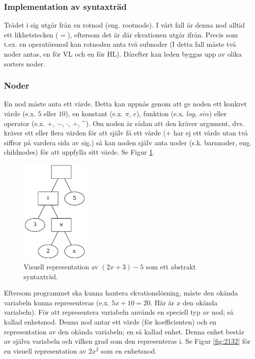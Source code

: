 \documentclass[12pt,a4paper]{article}
\begin{document}
\subsubsection{Implementation av syntaxträd}
Trädet i sig utgår från en rotnod (eng. rootnode). I vårt fall är denna nod alltid ett likhetstecken (\(=\)), eftersom det är där ekvationen utgår ifrån. Precis som t.ex. en operatörsnod kan rotnoden anta två subnoder (I detta fall måste två noder antas, en för VL och en för HL). Därefter kan leden byggas upp av olika sorters noder.
\subsubsection{Noder}
\label{subsubsec:noder}
En nod måste anta ett värde. Detta kan uppnås genom att ge noden ett konkret värde (e.x. \(5\) eller \(10\)), en konstant (e.x. \(\pi\), \(e\)), funktion (e.x. \(log\), \(sin\)) eller operator (e.x. \(+\), \(-\), \(\cdot\), \(\div\), \string^). Om noden är sådan att den kräver argument, dvs. kräver ett eller flera värden för att själv få ett värde (\(+\) har ej ett värde utan två siffror på vardera sida av sig.) så kan noden själv anta noder (s.k. barnnoder, eng. childnodes) för att uppfylla sitt värde. Se Figur \ref{fig:2131}.
\begin{figure}[h]
  \centering
  \includegraphics[width=0.3\textwidth]{image24}
  \caption{Visuell representation av \((2x + 3) - 5\) som ett abstrakt syntaxträd.}
  \label{fig:2131}
\end{figure}
Eftersom programmet ska kunna hantera ekvationslösning, måste den okända variabeln kunna representeras (e.x. \(5x + 10 = 20\). Här är \(x\) den okända variabeln). För att representera variabeln används en speciell typ av nod; så kallad enhetsnod. Denna nod antar ett värde (för koefficienten) och en representation av den okända variabeln; en så kallad enhet. Denna enhet består av själva variabeln och vilken grad som den representeras i. Se Figur \ref{fig:2132} för en visuell representation av \(2x^{2}\) som en enhetsnod.
\end{document}

